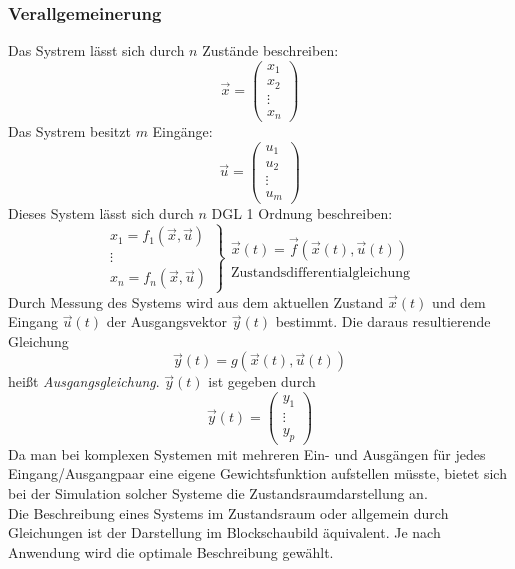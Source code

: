 \documentclass[12pt,a4paper,ngerman]{scrartcl}
\begin{document}
\subsubsection*{Verallgemeinerung}

Das Systrem lässt sich durch $n$ Zustände beschreiben:
\[
\vec{x}=
\begin{pmatrix}
x_1\\
x_2\\
\vdots\\
x_n
\end{pmatrix}
\]
Das Systrem besitzt $m$ Eingänge:
\[
\vec{u}=
\begin{pmatrix}
u_1\\
u_2\\
\vdots\\
u_m
\end{pmatrix}
\]
Dieses System lässt sich durch $n$ DGL 1 Ordnung beschreiben:
\[
\left.
\begin{array}{cc}
x_1=f_1(\vec{x},\vec{u})\\
\vdots\\
x_n=f_n(\vec{x},\vec{u})
\end{array}
\right\}
\begin{array}{ll}
\vec{x}(t)=\vec{f}(\vec{x}(t),\vec{u}(t))\\
\text{Zustandsdifferentialgleichung}
\end{array}
\]
Durch Messung des Systems wird aus dem aktuellen Zustand $\vec{x}(t)$ und dem Eingang $\vec{u}(t)$ der Ausgangsvektor $\vec{y}(t)$ bestimmt. Die daraus resultierende Gleichung
\begin{equation*}
  \vec{y}(t)=g(\vec{x}(t),\vec{u}(t))
\end{equation*}
heißt \emph{Ausgangsgleichung}. $\vec{y}(t)$ ist gegeben durch 
\begin{equation*}
  \vec{y}(t)=
\begin{pmatrix}
y_1\\
\vdots\\
y_p
\end{pmatrix}
\end{equation*}
Da man bei komplexen Systemen mit mehreren Ein- und Ausgängen für jedes Eingang/Ausgangpaar eine eigene Gewichtsfunktion aufstellen müsste, bietet sich bei der Simulation solcher Systeme die Zustandsraumdarstellung an.\\  
Die Beschreibung eines Systems im Zustandsraum oder allgemein durch Gleichungen ist der Darstellung im Blockschaubild äquivalent. Je nach Anwendung wird die optimale Beschreibung gewählt. 
\end{document}
